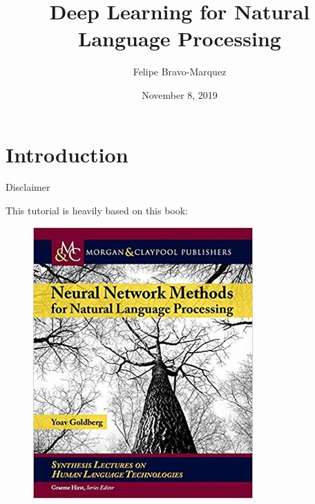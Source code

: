 \documentclass[handout]{beamer}
\title{Deep Learning for Natural Language Processing }
\author[Felipe Bravo Márquez]{\footnotesize
 \textcolor[rgb]{0.00,0.00,1.00}{Felipe Bravo-Marquez}}
\institute{Department of Computer Science, University of Chile \& IMFD}
\date{November 8, 2019}
\begin{document}
\begin{frame}
\titlepage


\end{frame}


\section{Introduction}

\begin{frame}{Disclaimer}

 This tutorial is heavily based on this book:
   \begin{figure}[h]
        	\includegraphics[scale = 0.4]{pics/goldbergNLP.jpg}
        \end{figure}
 
\end{frame}
\end{document}
